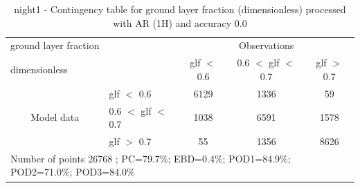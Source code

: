 \begin{table}[p!]
\begin{center}
\begin{tabular}{llccc}
\hline
{ground layer fraction}                                       &                                                    & \multicolumn{3}{c}{Observations}                 \\
{dimensionless}                                       &                             & glf $<$ 0.6   & 0.6 $<$ glf $<$ 0.7 & glf $>$ 0.7 \\
\hline
\multicolumn{1}{c}{\multirow{3}{*}{Model data}}  & glf $<$ 0.6             & 6129                & 1336                       & 59              \\
                                                 & 0.6  $<$ glf $<$ 0.7 & 1038                & 6591                       & 1578              \\
                                                 & glf $>$ 0.7             & 55                & 1356                       & 8626              \\
\hline
\multicolumn{5}{l}{ Number of points        26768 ; PC=79.7\%; EBD=0.4\%; POD1=84.9\%; POD2=71.0\%; POD3=84.0\%}
\end{tabular}
\end{center}
\caption{night1 - Contingency table for  ground layer fraction (dimensionless) processed with AR (1H) and accuracy 0.0}
\label{tab:contingencyglfAFT:night1}
\end{table}
